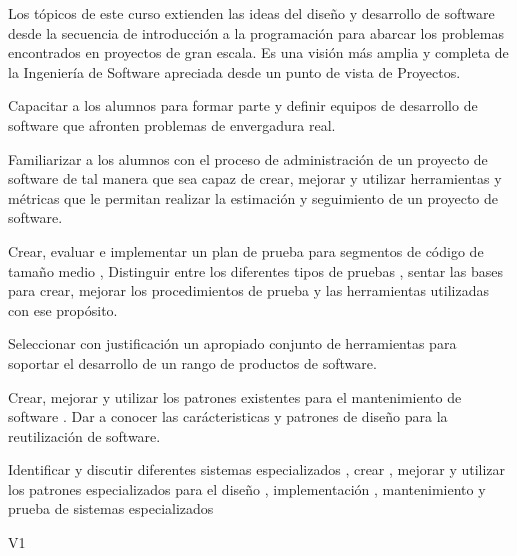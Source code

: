 \begin{syllabus}


\begin{justification}
Los tópicos de este curso extienden las ideas del diseño y desarrollo de software desde la secuencia de introducción a la programación para
abarcar los problemas encontrados en proyectos de gran escala. Es una visión más amplia y completa de la Ingeniería 
de Software apreciada desde un punto de vista de Proyectos.
\end{justification}

\begin{goals}
\item Capacitar a los alumnos para formar parte y definir equipos de desarrollo de software que afronten problemas de envergadura real.
\item Familiarizar a los alumnos con el proceso de administración de un proyecto de software de tal manera que sea capaz de crear, mejorar y utilizar herramientas y métricas que le permitan realizar la estimación y seguimiento de un proyecto de software.
\item Crear, evaluar e implementar un plan de prueba para segmentos de código de tamaño medio  , Distinguir entre los diferentes tipos de pruebas ,  sentar las bases para  crear, mejorar los procedimientos de prueba y las herramientas utilizadas con ese propósito.
\item Seleccionar con justificación un apropiado conjunto de herramientas para soportar el desarrollo de un rango de productos de software.
\item Crear, mejorar y utilizar  los patrones existentes para el mantenimiento de software . Dar a conocer las carácteristicas y patrones de diseño para la reutilización de software.
\item Identificar y discutir diferentes sistemas especializados , crear , mejorar y utilizar los patrones especializados para el diseño , implementación , mantenimiento y prueba   de sistemas especializados
\end{goals}

\begin{outcomes}{V1}
    \item {}
    \item {}
    \item {}
\end{outcomes}


\end{syllabus}
